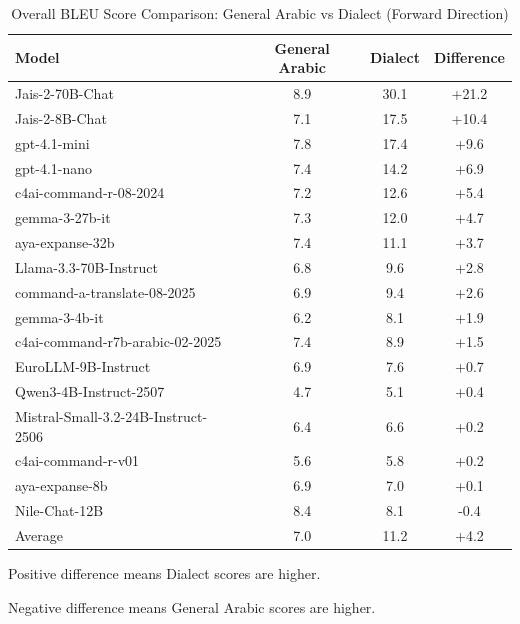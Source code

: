 \begin{table}[h]
\centering
\caption{Overall BLEU Score Comparison: General Arabic vs Dialect (Forward Direction)}
\label{tab:overall-general-dialect-difference}
\begin{tabular}{lccc}
\toprule
Model & General Arabic & Dialect & Difference \\
\midrule
Jais-2-70B-Chat & 8.9 & 30.1 & +21.2 \\
Jais-2-8B-Chat & 7.1 & 17.5 & +10.4 \\
gpt-4.1-mini & 7.8 & 17.4 & +9.6 \\
gpt-4.1-nano & 7.4 & 14.2 & +6.9 \\
c4ai-command-r-08-2024 & 7.2 & 12.6 & +5.4 \\
gemma-3-27b-it & 7.3 & 12.0 & +4.7 \\
aya-expanse-32b & 7.4 & 11.1 & +3.7 \\
Llama-3.3-70B-Instruct & 6.8 & 9.6 & +2.8 \\
command-a-translate-08-2025 & 6.9 & 9.4 & +2.6 \\
gemma-3-4b-it & 6.2 & 8.1 & +1.9 \\
c4ai-command-r7b-arabic-02-2025 & 7.4 & 8.9 & +1.5 \\
EuroLLM-9B-Instruct & 6.9 & 7.6 & +0.7 \\
Qwen3-4B-Instruct-2507 & 4.7 & 5.1 & +0.4 \\
Mistral-Small-3.2-24B-Instruct-2506 & 6.4 & 6.6 & +0.2 \\
c4ai-command-r-v01 & 5.6 & 5.8 & +0.2 \\
aya-expanse-8b & 6.9 & 7.0 & +0.1 \\
Nile-Chat-12B & 8.4 & 8.1 & -0.4 \\
\midrule
Average & 7.0 & 11.2 & +4.2 \\
\bottomrule
\end{tabular}
\begin{tablenotes}
\small
\item Positive difference means Dialect scores are higher.
\item Negative difference means General Arabic scores are higher.
\end{tablenotes}
\end{table}
